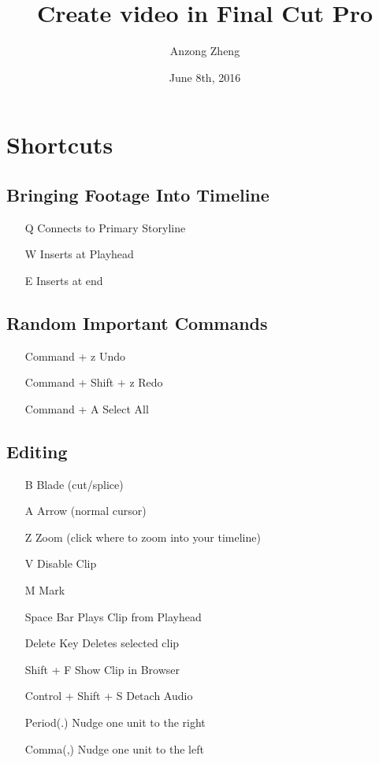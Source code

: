\documentclass[10pt,a4paper]{article}
\begin{document}
\author{Anzong Zheng}
\title{Create video in Final Cut Pro}
\date{June 8th, 2016}
\maketitle
\newpage

\section{Shortcuts}
\subsection{Bringing Footage Into Timeline}
\begin{itemize}
\item[Q] Connects to Primary Storyline
\item[W] Inserts at Playhead
\item[E] Inserts at end
\end{itemize}

\subsection{Random Important Commands}
\begin{itemize}
\item[Command + z] Undo
\item[Command + Shift + z] Redo
\item[Command + A] Select All
\end{itemize}

\subsection{Editing}
\begin{itemize}
\item[B] Blade (cut/splice)
\item[A] Arrow (normal cursor)
\item[Z] Zoom (click where to zoom into your timeline)
\item[V] Disable Clip
\item[M] Mark
\item[Space Bar] Plays Clip from Playhead
\item[Delete Key] Deletes selected clip
\item[Shift + F] Show Clip in Browser
\item[Control + Shift + S] Detach Audio
\item[Period(.)] Nudge one unit to the right
\item[Comma(,)] Nudge one unit to the left
\end{itemize}
\end{document}
